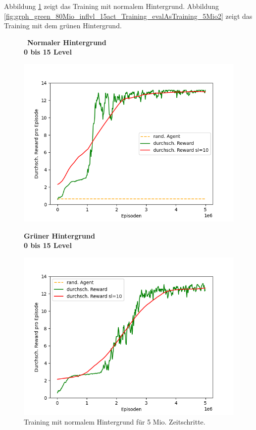 Abbildung \ref{fig:grph_green_80Mio_200lvl_15act_Training_evalAsTraining_5Mio1} zeigt das Training mit normalem Hintergrund. Abbildung \ref{fig:grph_green_80Mio_inflvl_15act_Training_evalAsTraining_5Mio2} zeigt das Training mit dem grünen Hintergrund.

\begin{figure}[htp!]
   \centering
   \captionsetup{width=0.45\linewidth} 
    \begin{minipage}{0.48\linewidth}
        \centering\
        \textbf{Normaler Hintergrund\\0 bis 15 Level}\par\medskip
        \includegraphics[scale=0.5]{abb/_graphen/tTimesteps_eprewmean_smooth_normal}
        \caption{Training mit normalem Hintergrund für 5 Mio. Zeitschritte.}
        \label{fig:grph_green_80Mio_200lvl_15act_Training_evalAsTraining_5Mio1} 
    \end{minipage}
    \centering
    \begin{minipage}{0.48\linewidth}
        \centering
        \textbf{Grüner Hintergrund\\0 bis 15 Level}\par\medskip
        \includegraphics[scale=0.5]{abb/_graphen/tTimesteps_eprewmean_smooth_green} 

\end{minipage}
\end{figure}
